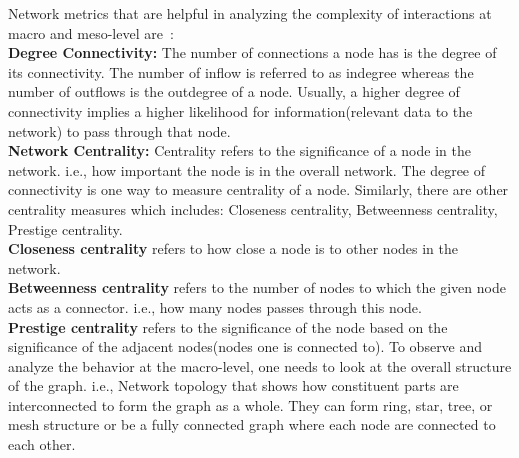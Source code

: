 Network metrics that are helpful in analyzing the complexity of
interactions at macro and meso-level are~\cite{gkorou2014exploiting}: \\
\textbf{Degree Connectivity:} The number of connections a node has is the
degree of its connectivity. The number of inflow is referred to as indegree
whereas the number of outflows is the outdegree of a node. Usually, a higher
degree of connectivity implies a higher likelihood for information(relevant
data to the network) to pass through that node.\\
\textbf{Network Centrality:} Centrality refers to the significance of a node in
the network. i.e., how important the node is in the overall network. The degree
of connectivity is one way to measure centrality of a node. Similarly, there
are other centrality measures which includes: Closeness centrality,
Betweenness centrality, Prestige centrality.\\ 
\textbf{Closeness centrality} refers to how close a node is to other nodes in
the network.  \\
\textbf{Betweenness centrality} refers to the number of nodes to
which the given node acts as a connector. i.e., how many nodes passes through
this node.\\
\textbf{Prestige centrality} refers to the significance of the node
based on the significance of the adjacent nodes(nodes one is connected to).  To
observe and analyze the behavior at the macro-level, one needs to look at the
overall structure of the graph. i.e., Network topology that shows how
constituent parts are interconnected to form the graph as a whole. They can
form ring, star, tree, or mesh structure or be a fully connected graph where
each node are connected to each other. 

